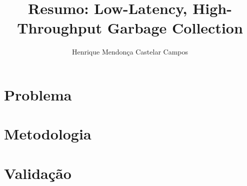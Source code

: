 \documentclass[12pt]{article}
\title{Resumo: Low-Latency, High-Throughput Garbage Collection}
\author{Henrique Mendonça Castelar Campos}
\begin{document}
 

\maketitle

\section{Problema}

\section{Metodologia}

\section{Validação}




\nocite{10.1145/3519939.3523440}
\end{document}

